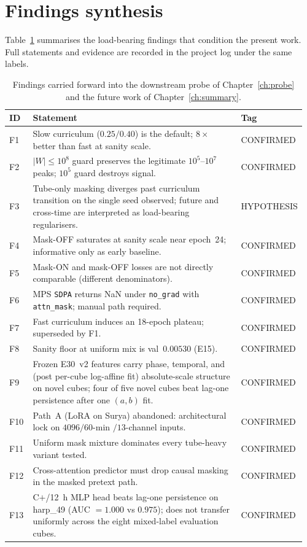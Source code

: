 \section{Findings synthesis}
\label{sec:exp-findings}

Table~\ref{tab:findings} summarises the load-bearing findings that
condition the present work. Full statements and evidence are
recorded in the project log under the same labels.

\begin{table}[htbp]
\centering
\small
\begin{tabular}{p{0.08\linewidth}p{0.78\linewidth}p{0.10\linewidth}}
\toprule
ID & Statement & Tag \\
\midrule
F1  & Slow curriculum ($0.25/0.40$) is the default; $8\times$ better than fast at sanity scale. & CONFIRMED \\
F2  & $|W| \leq 10^{8}$ guard preserves the legitimate $10^{5}$--$10^{7}$ peaks; $10^{5}$ guard destroys signal. & CONFIRMED \\
F3  & Tube-only masking diverges past curriculum transition on the single seed observed; future and cross-time are interpreted as load-bearing regularisers. & HYPOTHESIS \\
F4  & Mask-OFF saturates at sanity scale near epoch~24; informative only as early baseline. & CONFIRMED \\
F5  & Mask-ON and mask-OFF losses are not directly comparable (different denominators). & CONFIRMED \\
F6  & MPS \texttt{SDPA} returns NaN under \texttt{no\_grad} with \texttt{attn\_mask}; manual path required. & CONFIRMED \\
F7  & Fast curriculum induces an 18-epoch plateau; superseded by F1. & CONFIRMED \\
F8  & Sanity floor at uniform mix is val~$0.00530$ (E15). & CONFIRMED \\
F9  & Frozen E30~v2 features carry phase, temporal, and (post per-cube log-affine fit) absolute-scale structure on novel cubes; four of five novel cubes beat lag-one persistence after one $(a, b)$ fit. & CONFIRMED \\
F10 & Path~A (LoRA on Surya) abandoned: architectural lock on $4096 / 60$-min $/ 13$-channel inputs. & CONFIRMED \\
F11 & Uniform mask mixture dominates every tube-heavy variant tested. & CONFIRMED \\
F12 & Cross-attention predictor must drop causal masking in the masked pretext path. & CONFIRMED \\
F13 & C$+$/12~h MLP head beats lag-one persistence on harp\_49 (AUC $= 1.000$ vs $0.975$); does not transfer uniformly across the eight mixed-label evaluation cubes. & CONFIRMED \\
\bottomrule
\end{tabular}
\caption{Findings carried forward into the downstream probe of
Chapter~\ref{ch:probe} and the future work of
Chapter~\ref{ch:summary}.}
\label{tab:findings}
\end{table}
